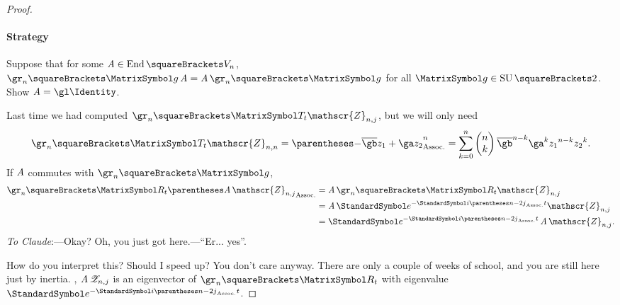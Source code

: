 \documentclass[10pt, a4paper, twoside]{lecturenotes}
\newcommand{\cz}{\mathscr{Z}}
\begin{document}
\begin{theorem}
\begin{proof}
\paragraph*{Strategy} Suppose that for some $\opA\in\Endomorphisms\of{V_n}$, $\gr_n\of\matg\opA = \opA\gr_n\of\matg$ for all $\matg\in\SpecialUnitaryGroup\of 2$. Show $\opA=\gl\Identity$.

\NewLecture[date=2013-05-16]
Last time we had computed $\gr_n\of{\matT_t}\cz_{n,j}$, but we will only need \[
\gr_n\of{\matT_t}\cz_{n,n}=\pa{-\conj\gb z_1 + \ga z_2}^n = \sum{k=0}[n] \binom{n}{k} \conj\gb^{n-k}\ga^k {z_1}^{n-k} {z_2}^k\text.\]
If $\operatorname{\mathit{A}}$ commutes with $\gr_n\of\matg$,
\begin{align*}
\gr_n\of{\matR_t}\pa{\opA\cz_{n,j}}
&= \opA\gr_n\of{\matR_t}\cz_{n,j}\\
&= \opA\E^{-\I\pa{n-2j}t}\cz_{n,j}\\
&= \E^{-\I\pa{n-2j}t}\opA\cz_{n,j}\text.
\end{align*}
\emph{To Claude}:---Okay? Oh, you just got here.---``Er... yes''.

How do you interpret this? Should I speed up? You don't care anyway.
There are only a couple of weeks of school, and you are still here just by inertia.
, $\opA\cz_{n,j}$ is an eigenvector of $\gr_n\of{\matR_t}$ with eigenvalue $\E^{-\I\pa{n-2j}t}$.


\end{proof}
\end{theorem}
\end{document}
